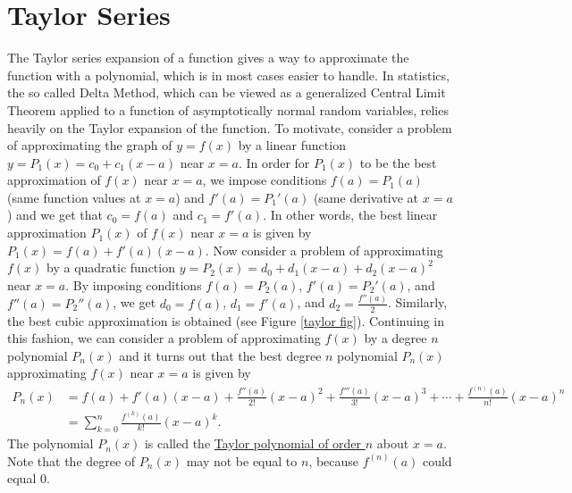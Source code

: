 \documentclass[12pt,letterpaper]{book}
\numberwithin{equation}{section}
\theoremstyle{definition}
\begin{document}
\section{Taylor Series}
The Taylor series expansion of a function gives a way to approximate the function with a polynomial, which is in most cases easier to handle. In statistics, the so called Delta Method, which can be viewed as a generalized Central Limit Theorem applied to a function of asymptotically normal random variables, relies heavily on the Taylor expansion of the function. To motivate, consider a problem of approximating the graph of $y=f(x)$ by a linear function $y=P_1(x)=c_0+c_1(x-a)$ near $x=a$. In order for $P_1(x)$ to be the best approximation of $f(x)$ near $x=a$, we impose conditions $f(a)=P_1(a)$ (same function values at $x=a$) and $f'(a)=P_1'(a)$ (same derivative at $x=a$) and we get that $c_0=f(a)$ and $c_1=f'(a)$. In other words, the best linear approximation $P_1(x)$ of $f(x)$ near $x=a$ is given by $P_1(x)=f(a)+f'(a)(x-a)$. Now consider a problem of approximating $f(x)$ by a quadratic function $y=P_2(x)=d_0+d_1(x-a)+d_2(x-a)^2$ near $x=a$. By imposing conditions $f(a)=P_2(a)$, $f'(a)=P_2'(a)$, and $f''(a)=P_2''(a)$, we get $d_0=f(a)$, $d_1=f'(a)$, and $d_2=\frac{f''(a)}{2}$. Similarly, the best cubic approximation is obtained (see Figure \ref{taylor fig}). Continuing in this fashion, we can consider a problem of approximating $f(x)$ by a degree $n$ polynomial $P_n(x)$ and it turns out that the best degree $n$ polynomial $P_n(x)$ approximating $f(x)$ near $x=a$ is given by
\begin{align*} P_n(x)&=f(a)+f'(a)(x-a)+\frac{f''(a)}{2!}(x-a)^2+\frac{f'''(a)}{3!}(x-a)^3+\cdots+\frac{f^{(n)}(a)}{n!}(x-a)^n\\
&=\sum_{k=0}^n \frac{f^{(k)}(a)}{k!}(x-a)^k.
\end{align*}
The polynomial $P_n(x)$ is called the \underline{Taylor polynomial of order $n$} about $x=a$.  Note that the degree of $P_n(x)$ may not be equal to $n$, because $f^{(n)}(a)$ could equal $0$.
\end{document}
